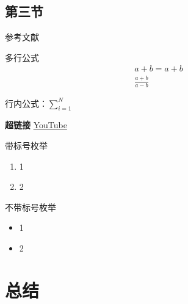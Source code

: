 \documentclass[UTF8,a4paper,10pt]{ctexart}
\newcommand{\xiaosi}{\fontsize{12pt}{18pt}\selectfont}            %
\begin{document}
\subsection{第三节}

参考文献\cite{adams1995hitchhiker}\cite{shin2016deep}
    
多行公式
\begin{align}
  a+b = a + b \\
  \frac{a+b}{a-b}
\end{align}

行内公式：$\sum^N_{i=1}$

\textbf{超链接}  \href{http://youtube.com/}{YouTube}

带标号枚举
\begin{enumerate}
  \item 1
  \item 2
\end{enumerate}

不带标号枚举
\begin{itemize}
  \item 1
  \item 2
\end{itemize}

\xiaosi{切换字体大小}

\section{总结}

\newpage

 
\end{document}
